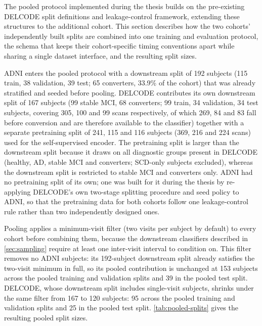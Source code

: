 The pooled protocol implemented during the thesis builds on the pre-existing
\ac{DELCODE} split definitions and leakage-control framework, extending these structures
to the additional cohort. This section describes how the two cohorts' independently built
splits are combined into one training and evaluation protocol, the schema that keeps their
cohort-specific timing conventions apart while sharing a single dataset interface, and the
resulting split sizes.

\ac{ADNI} enters the pooled protocol with a downstream split of 192 subjects (115 train,
38 validation, 39 test; 65 converters, 33.9\% of the cohort) that was already stratified
and seeded before pooling. \ac{DELCODE} contributes its own downstream split of 167
subjects (99 stable \ac{MCI}, 68 converters; 99 train, 34 validation, 34 test subjects,
covering 305, 100 and 99 scans respectively, of which 269, 84 and 83 fall before
conversion and are therefore available to the classifier) together with a separate
pretraining split of 241, 115 and 116 subjects (369, 216 and 224 scans) used for the
self-supervised encoder. The pretraining split is larger than the downstream split
because it draws on all diagnostic groups present in \ac{DELCODE} (healthy, \ac{AD},
stable \ac{MCI} and converters; \ac{SCD}-only subjects excluded), whereas the downstream
split is restricted to stable \ac{MCI} and converters only.
\ac{ADNI} had no pretraining split of its own; one was built for it during the thesis by
re-applying \ac{DELCODE}'s own two-stage splitting procedure and seed policy to \ac{ADNI},
so that the pretraining data for both cohorts follow one leakage-control rule rather than
two independently designed ones.

Pooling applies a minimum-visit filter (two visits per subject by default) to every cohort
before combining them, because the downstream classifiers described in
\autoref{sec:sampling} require at least one inter-visit interval to condition on. This
filter removes no \ac{ADNI} subjects: its 192-subject downstream split already satisfies
the two-visit minimum in full, so its pooled contribution is unchanged at 153 subjects
across the pooled training and validation splits and 39 in the pooled test split.
\ac{DELCODE}, whose downstream split includes single-visit subjects, shrinks under the
same filter from 167 to 120 subjects: 95 across the pooled training and validation splits
and 25 in the pooled test split. \autoref{tab:pooled-splits} gives the resulting pooled
split sizes.

